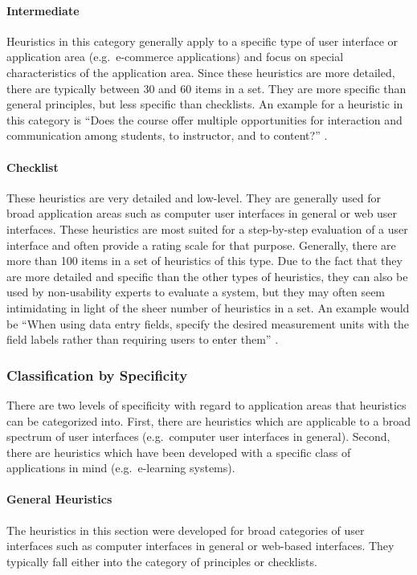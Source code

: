\paragraph{Intermediate} Heuristics in this category generally apply to a specific type of user interface or application area (e.g.\ e-commerce applications) and focus on special characteristics of the application area. Since these heuristics are more detailed, there are typically between 30 and 60 items in a set. They are more specific than general principles, but less specific than checklists. An example for a heuristic in this category is ``Does the course offer multiple opportunities for interaction and communication among students, to instructor, and to content?'' \citep{Oztekin2010}.

\paragraph{Checklist} These heuristics are very detailed and low-level. They are generally used for broad application areas such as computer user interfaces in general or web user interfaces. These heuristics are most suited for a step-by-step evaluation of a user interface and often provide a rating scale for that purpose. Generally, there are more than 100 items in a set of heuristics of this type. Due to the fact that they are more detailed and specific than the other types of heuristics, they can also be used by non-usability experts to evaluate a system, but they may often seem intimidating in light of the sheer number of heuristics in a set. An example would be ``When using data entry fields, specify the desired measurement units with the field labels rather than requiring users to enter them'' \citep{Leavitt2006}.

\subsubsection{Classification by Specificity}
There are two levels of specificity with regard to application areas that heuristics can be categorized into. First, there are heuristics which are applicable to a broad spectrum of user interfaces (e.g.\ computer user interfaces in general). Second, there are heuristics which have been developed with a specific class of applications in mind (e.g.\ e-learning systems).

\paragraph{General Heuristics}
The heuristics in this section were developed for broad categories of user interfaces such as computer interfaces in general or web-based interfaces. They typically fall either into the category of principles or checklists.

